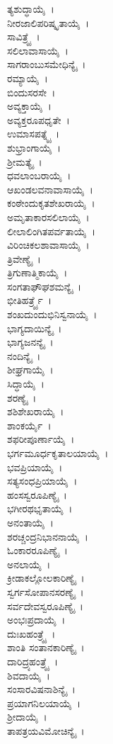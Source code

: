 ತ್ಯಶುದ್ಧಾಯೈ~।\\ ನೀರಜಾಲಿಪರಿಷ್ಕೃತಾಯೈ~।\\ ಸಾವಿತ್ರ್ಯೈ~।\\ ಸಲಿಲಾವಾಸಾಯೈ~।\\ ಸಾಗರಾಂಬುಸಮೇಧಿನ್ಯೈ~।\\ ರಮ್ಯಾಯೈ~।\\ ಬಿಂದುಸರಸೇ~।\\ ಅವ್ಯಕ್ತಾಯೈ~।\\ ಅವ್ಯಕ್ತರೂಪಧೃತೇ~।\\ ಉಮಾಸಪತ್ನ್ಯೈ~।\\ ಶುಭ್ರಾಂಗಾಯೈ~।\\ ಶ್ರೀಮತ್ಯೈ~।\\ ಧವಲಾಂಬರಾಯೈ~।\\ ಆಖಂಡಲವನಾವಾಸಾಯೈ~।\\ ಕಂಠೇಂದುಕೃತಶೇಖರಾಯೈ~।\\ ಅಮೃತಾಕಾರಸಲಿಲಾಯೈ~।\\ ಲೀಲಾಲಿಂಗಿತಪರ್ವತಾಯೈ~।\\ ವಿರಿಂಚಿಕಲಶಾವಾಸಾಯೈ~।\\ ತ್ರಿವೇಣ್ಯೈ~।\\ ತ್ರಿಗುಣಾತ್ಮಿಕಾಯೈ~।\\ ಸಂಗತಾಘೌಘಶಮನ್ಯೈ~।\\ ಭೀತಿಹರ್ತ್ರ್ಯೈ~।\\ ಶಂಖದುಂದುಭಿನಿಸ್ವನಾಯೈ~।\\ ಭಾಗ್ಯದಾಯಿನ್ಯೈ~।\\ ಭಾಗ್ಯಜನನ್ಯೈ~।\\ ನಂದಿನ್ಯೈ~।\\ ಶೀಘ್ರಗಾಯೈ~।\\ ಸಿದ್ಧಾಯೈ~।\\ ಶರಣ್ಯೈ~।\\ ಶಶಿಶೇಖರಾಯೈ~।\\ ಶಾಂಕರ್ಯೈ~।\\ ಶಫರೀಪೂರ್ಣಾಯೈ~।\\ ಭರ್ಗಮೂರ್ಧಕೃತಾಲಯಾಯೈ~।\\ ಭವಪ್ರಿಯಾಯೈ~।\\ ಸತ್ಯಸಂಧಪ್ರಿಯಾಯೈ~।\\ ಹಂಸಸ್ವರೂಪಿಣ್ಯೈ~।\\ ಭಗೀರಥಭೃತಾಯೈ~।\\ ಅನಂತಾಯೈ~।\\ ಶರಚ್ಚಂದ್ರನಿಭಾನನಾಯೈ~।\\ ಓಂಕಾರರೂಪಿಣ್ಯೈ~।\\ ಅನಲಾಯೈ~।\\ ಕ್ರೀಡಾಕಲ್ಲೋಲಕಾರಿಣ್ಯೈ~।\\ ಸ್ವರ್ಗಸೋಪಾನಸರಣ್ಯೈ~।\\ ಸರ್ವದೇವಸ್ವರೂಪಿಣ್ಯೈ~।\\ ಅಂಭಃಪ್ರದಾಯೈ~।\\ ದುಃಖಹಂತ್ರ್ಯೈ~।\\ ಶಾಂತಿ ಸಂತಾನಕಾರಿಣ್ಯೈ~।\\ ದಾರಿದ್ರ್ಯಹಂತ್ರ್ಯೈ~।\\ ಶಿವದಾಯೈ~।\\ ಸಂಸಾರವಿಷನಾಶಿನ್ಯೈ~।\\ ಪ್ರಯಾಗನಿಲಯಾಯೈ~।\\ ಶ್ರೀದಾಯೈ~।\\ ತಾಪತ್ರಯವಿಮೋಚಿನ್ಯೈ~।\\ 